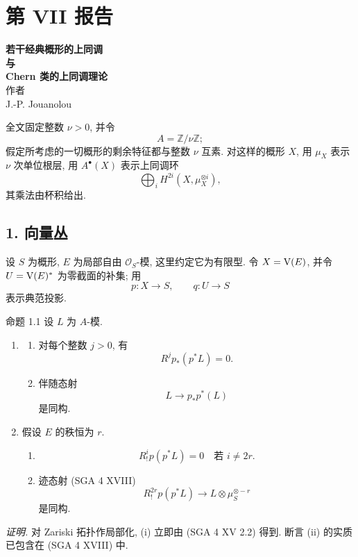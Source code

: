 
\section*{第 VII 报告}

\begin{center}
\textbf{若干经典概形的上同调}\\[0.5em]
\textbf{与}\\[0.5em]
\textbf{Chern 类的上同调理论}\\[1em]
作者\\[0.5em]
J.-P. Jouanolou
\end{center}

全文固定整数 $\nu>0$, 并令
\[
A=\mathbb Z/\nu\mathbb Z;
\]
假定所考虑的一切概形的剩余特征都与整数 $\nu$ 互素. 对这样的概形 $X$, 用 $\mu_X$ 表示 $\nu$ 次单位根层, 用 $A^{\bullet}(X)$ 表示上同调环
\[
\bigoplus_i H^{2i}(X,\mu_X^{\otimes i}),
\]
其乘法由杯积给出.

\subsection*{1. 向量丛}

设 $S$ 为概形, $E$ 为局部自由 $\mathcal O_S$-模, 这里约定它为有限型. 令 $X=\mathrm V(E)$, 并令 $U=\mathrm V(E)^*$ 为零截面的补集; 用
\[
p:X\to S,
\qquad
q:U\to S
\]
表示典范投影.

\begin{statement}{命题 1.1}
设 $L$ 为 $A$-模.
\begin{enumerate}[label=(\roman*)]
\item
\begin{enumerate}[label=\alph*)]
\item 对每个整数 $j>0$, 有
\[
R^j p_*(p^*L)=0.
\]
\item 伴随态射
\[
L\longrightarrow p_*p^*(L)
\]
是同构.
\end{enumerate}
\item 假设 $E$ 的秩恒为 $r$.
\begin{enumerate}[label=\alph*)]
\item
\[
R_!^i p(p^*L)=0\quad\text{若 }i\ne 2r.
\]
\item 迹态射 (SGA 4 XVIII)
\[
R_!^{2r}p(p^*L)\longrightarrow L\otimes\mu_S^{\otimes -r}
\]
是同构.
\end{enumerate}
\end{enumerate}
\end{statement}

\emph{证明.} 对 Zariski 拓扑作局部化, (i) 立即由 (SGA 4 XV 2.2) 得到. 断言 (ii) 的实质已包含在 (SGA 4 XVIII) 中.

